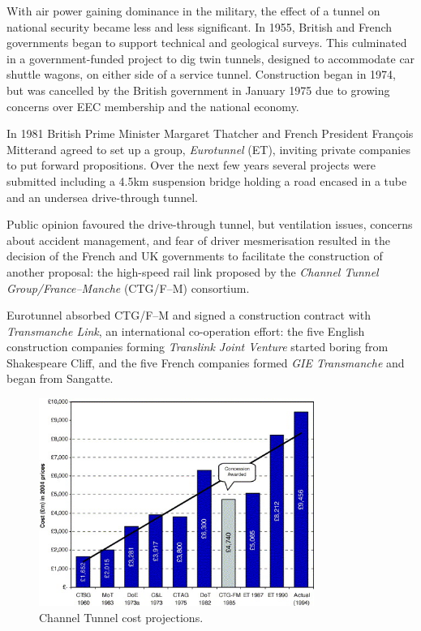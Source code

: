 \documentclass[12pt]{article} %
\begin{document}
With air power gaining dominance in the military, the effect of a tunnel on national security became less and less significant. In 1955, British and French governments began to support technical and geological surveys. This culminated in a government-funded project to dig twin tunnels, designed to accommodate car shuttle wagons, on either side of a service tunnel. Construction began in 1974, but was cancelled by the British government in January 1975 due to growing concerns over EEC membership and the national economy.

In 1981 British Prime Minister Margaret Thatcher and French President François Mitterand agreed to set up a group, \emph{Eurotunnel} (ET), inviting private companies to put forward propositions. Over the next few years several projects were submitted including a 4.5km suspension bridge holding a road encased in a tube and an undersea drive-through tunnel.

Public opinion favoured the drive-through tunnel, but ventilation issues, concerns about accident management, and fear of driver mesmerisation resulted in the decision of the French and UK governments to facilitate the construction of another proposal: the high-speed rail link proposed by the \emph{Channel Tunnel Group\slash France--Manche} (CTG\slash F--M) consortium.

Eurotunnel absorbed CTG\slash F--M and signed a construction contract with \emph{Transmanche Link}, an international co-operation effort: the five English construction companies forming \emph{Translink Joint Venture} started boring from Shakespeare Cliff, and the five French companies formed \emph{GIE Transmanche} and began from Sangatte.

\begin{figure}[tp]
  \centering
  \includegraphics[width=0.8\textwidth]{costproj}
  \caption{Channel Tunnel cost projections.}
  \label{fig:costproj}
\end{figure}
\end{document}
